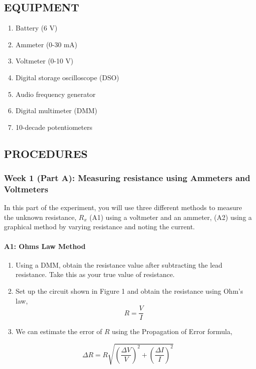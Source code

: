 \documentclass[twocolumn,a4paper,11pt]{article}
\begin{document}
\subsection*{EQUIPMENT}
\begin{enumerate}
    \item Battery (6 V)
    \item Ammeter (0-30 mA)
    \item Voltmeter (0-10 V)
    \item Digital storage oscilloscope (DSO)
    \item Audio frequency generator
    \item Digital multimeter (DMM)
    \item 10-decade potentiometers
\end{enumerate}

\subsection*{PROCEDURES}

\subsubsection*{Week 1 (Part A): Measuring resistance using Ammeters and Voltmeters}

In this part of the experiment, you will use three different methods to measure the unknown resistance, \(R_x\) (A1) using a voltmeter and an ammeter, (A2) using a graphical method by varying resistance and noting the current.


\paragraph{A1: Ohms Law Method}
\begin{enumerate}
    \item Using a DMM, obtain the resistance value after subtracting the lead resistance. Take this as your true value of resistance.
    \item Set up the circuit shown in Figure 1 and obtain the resistance using Ohm's law, 
    \begin{equation}
     R = \frac{V}{I}
    \end{equation}
    \item We can estimate the error of \(R\) using the Propagation of Error formula,
\end{enumerate}

\begin{equation}
    \Delta R = R \sqrt{\left(\frac{\Delta V}{V}\right)^2 + \left(\frac{\Delta I}{I}\right)^2}
\end{equation}
\end{document}
